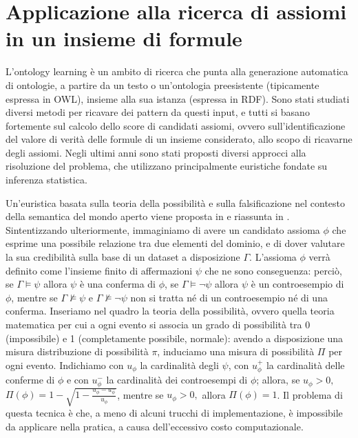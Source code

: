 \documentclass[12pt,a4paper]{report}
\begin{document}
\section{Applicazione alla ricerca di assiomi in un insieme di formule}

L'ontology learning è un ambito di ricerca che punta alla generazione automatica di ontologie, a partire da un testo o un'ontologia preesistente (tipicamente espressa in OWL), insieme alla sua istanza (espressa in RDF). Sono stati studiati diversi metodi per ricavare dei pattern da questi input, e tutti si basano fortemente sul calcolo dello score di candidati assiomi, ovvero sull'identificazione del valore di verità delle formule di un insieme considerato, allo scopo di ricavarne degli assiomi.
Negli ultimi anni sono stati proposti diversi approcci alla risoluzione del problema, che utilizzano principalmente euristiche fondate su inferenza statistica.

Un'euristica basata sulla teoria della possibilità e sulla falsificazione nel contesto della semantica del mondo aperto viene proposta in \cite{possibilitypaper} e riassunta in \cite{sacpaper}.
Sintentizzando ulteriormente, immaginiamo di avere un candidato assioma $\phi$ che esprime una possibile relazione tra due elementi del dominio, e di dover valutare la sua credibilità sulla base di un dataset a disposizione $\Gamma$.
L'assioma $\phi$  verrà definito come l'insieme finito di affermazioni $\psi$  che ne sono conseguenza: perciò, se  $\Gamma \models \psi$ allora $\psi$ è una conferma di $\phi$, se $\Gamma \models \neg \psi$ allora $\psi$ è un controesempio di $\phi$, mentre se 
$\Gamma \not\models \psi$ e $\Gamma \not\models \neg \psi$ non si tratta né di un controesempio né di una conferma.
Inseriamo nel quadro la teoria della possibilità, ovvero quella teoria matematica per cui a ogni evento si associa un grado di possibilità tra 0 (impossibile) e 1 (completamente possibile, normale): avendo a disposizione una misura distribuzione di possibilità $\pi$, induciamo una misura di possibilità $\Pi$ per ogni evento. 
Indichiamo con $u_\phi$ la cardinalità degli $\psi$, con  $u_{\phi}^+$ la cardinalità delle conferme di $\phi$ e con $u_{\phi}^-$ la cardinalità dei controesempi di $\phi$; allora, se $u_\phi > 0,$  $\Pi(\phi) = 1 - \sqrt{1 - \frac{u_\phi - u_{\phi}^-}{u_\phi}}$, mentre se $u_\phi > 0,$ allora $\Pi(\phi) = 1$.
Il problema di questa tecnica è che, a meno di alcuni trucchi di implementazione, è impossibile da applicare nella pratica, a causa dell'eccessivo costo computazionale.
\end{document}
